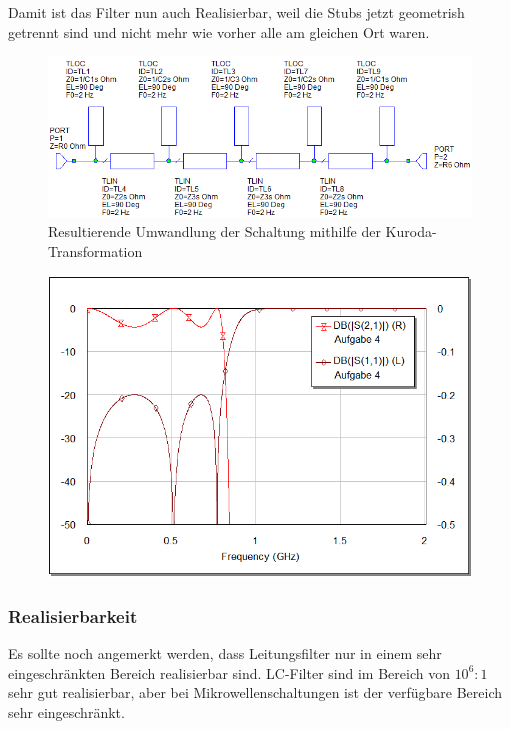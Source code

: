 Damit ist das Filter nun auch Realisierbar, weil die  Stubs  jetzt  geometrish
getrennt  sind  und  nicht  mehr  wie  vorher  alle  am  gleichen  Ort  waren.

\begin{figure}[h!]
    \centering
    \includegraphics[width=\imagewidth]{images/stripline-kuroda}
    \caption{Resultierende Umwandlung der Schaltung mithilfe der Kuroda-Transformation}
    \label{fig:stripline-kuroda}
\end{figure}

\begin{figure}[h!]
    \centering
    \includegraphics[width=\imagewidth]{images/graph-kuroda}
    \caption{}
    \label{fig:graph-kuroda}
\end{figure}


\subsubsection{Realisierbarkeit}

Es  sollte  noch  angemerkt werden, dass  Leitungsfilter  nur  in  einem  sehr
eingeschr\"ankten Bereich realisierbar sind.  LC-Filter  sind  im  Bereich von
$10^6:1$  sehr gut  realisierbar,  aber  bei  Mikrowellenschaltungen  ist  der
verf\"ugbare Bereich sehr eingeschr\"ankt.

